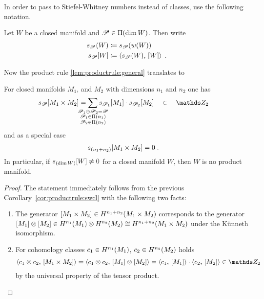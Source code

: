 In order to pass to Stiefel-Whitney numbers instead of classes, use
the following notation.
\begin{Def}
  Let $W$ be a closed manifold and $\mathscr{P}\in\Pi({\dim W})$.
  Then write
  \begin{align*}
    s_{\mathscr{P}}(W) &\coloneqq s_{\mathscr{P}}({w}(W))\\
    s_{\mathscr{P}}[W] &\coloneqq \left\langle s_{\mathscr{P}}(W),\, [W] \right\rangle
    \;.
  \end{align*}
\end{Def}

Now the product rule \autoref{lem:productrule:general} translates to
\begin{Cor}\label{cor:swnumdecompositionmfds}
  For closed manifolds $M_1$, and $M_2$ with dimensions $n_1$ and
  $n_2$ one has
  \begin{align*}
    \snum{\Part}{M_1\times M_2}
    &= \sum_{\mathclap{\substack{
      \Part_1\concat\Part_2=\Part\\
    \Part_1\in\PartitionsOf{n_1}\\
    \Part_2\in\PartitionsOf{n_2}\\
    }}}
    \snum{\Part_1}{M_1} \cdot \snum{\Part_2}{M_2}
    \quad \in \quad \Zmod2
  \end{align*}
  and as a special case
  \begin{align}
    \label{eq:productrule:swnum}
    s_{(n_1+n_2)}[M_1\times M_2] &= 0
                                      \;.
  \end{align}
  In particular, if $s_{(\dim W)}[W]\neq 0$ for a closed manifold
  $W$, then $W$ is no product manifold.
  \begin{proof}
    The statement immediately follows from the previous
    Corollary~\autoref{cor:productrule:swcl} with the following
    two facts:
    \begin{enumerate}
    \item The generator $[M_1\times
        M_2]\in H^{n_1+n_2}(M_1\times M_2)$ corresponds to the generator
      $[M_1]\otimes[M_2]\in
      H^{n_1}(M_1)\otimes H^{n_2}(M_2)\cong H^{n_1+n_2}(M_1\times M_2)$
      under the Künneth isomorphism.
    \item For cohomology classes $c_1\in H^{n_1}(M_1)$, $c_2\in H^{n_2}(M_2)$ holds
      \begin{gather*}
        \capped{c_1\otimes c_2}{\fundcl{M_1\times M_2}}
        = \capped{c_1\otimes c_2}{\fundcl{M_1}\otimes\fundcl{M_2}}
        = \capped{c_1}{\fundcl{M_1}} \cdot \capped{c_2}{\fundcl{M_2}}
        \in \Zmod2
      \end{gather*}
      by the universal property of the tensor product.
      \qedhere
    \end{enumerate}    
  \end{proof}
\end{Cor}

